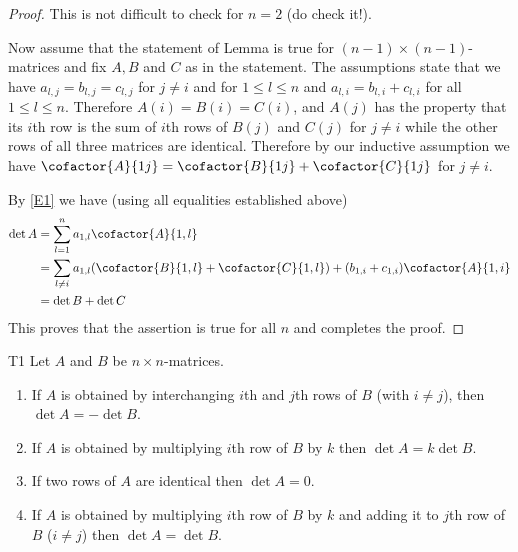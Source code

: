 \begin{proof}
  This is not difficult to check for $n=2$ (do check it!).

  Now assume that the statement of Lemma is true for
  $(n-1)\times (n-1)$-matrices and fix $A,B$ and $C$ as in the
  statement.  The assumptions state that we have
  $a_{l,j}=b_{l,j}=c_{l,j}$ for $j\neq i$ and for $1\leq l\leq n$ and
  $a_{l,i}=b_{l,i}+c_{l,i}$ for all $1\leq l\leq n$.  Therefore
  $A(i)=B(i)=C(i)$, and $A(j)$ has the property that its $i$th row is
  the sum of $i$th rows of $B(j)$ and $C(j)$ for $j\neq i$ while the
  other rows of all three matrices are identical.  Therefore by our
  inductive assumption we have $\cofactor{A}{1j}=\cofactor{B}{1j}+\cofactor{C}{1j}$
  for $j\neq i$.

  By \eqref{E1} we have (using all equalities established above)
  \begin{align*}
    \det A&=\sum_{l=1}^n a_{1,l} \cofactor{A}{1,l}\\
          &=\sum_{l\neq i} a_{1,l}(\cofactor{B}{1,l}+\cofactor{C}{1,l})+
            (b_{1,i}+c_{1,i})\cofactor{A}{1,i}\\
          &=
            \det B+\det C
  \end{align*}
  This proves that the assertion is true for all $n$ and completes the
  proof.
\end{proof}

\begin{theorem}{} {T1}
  Let $A$ and $B$ be $n\times n$-matrices.
  \begin{enumerate}
  \item If $A$ is obtained by interchanging $i$th and $j$th rows of
    $B$ (with $i\neq j$), then $\det A=-\det B$.
  \item If $A$ is obtained by multiplying $i$th row of $B$ by $k$ then
    $\det A=k\det B$.
  \item If two rows of $A$ are identical then $\det A=0$.
  \item If $A$ is obtained by multiplying $i$th row of $B$ by $k$ and
    adding it to $j$th row of $B$ ($i\neq j$) then $\det A=\det B$.
  \end{enumerate}
\end{theorem}


